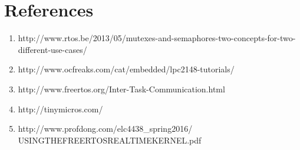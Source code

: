\documentclass[11pt,a4paper]{article}
\begin{document}
	\newpage
	\section{References}
	\begin{enumerate}
	\item  http://www.rtos.be/2013/05/mutexes-and-semaphores-two-concepts-for-two-different-use-cases/
	
	\item http://www.ocfreaks.com/cat/embedded/lpc2148-tutorials/
	\item http://www.freertos.org/Inter-Task-Communication.html
	\item http://tinymicros.com/
	\item http://www.profdong.com/elc4438\_spring2016/\\USINGTHEFREERTOSREALTIMEKERNEL.pdf
	\end{enumerate}	
	
\end{document}
